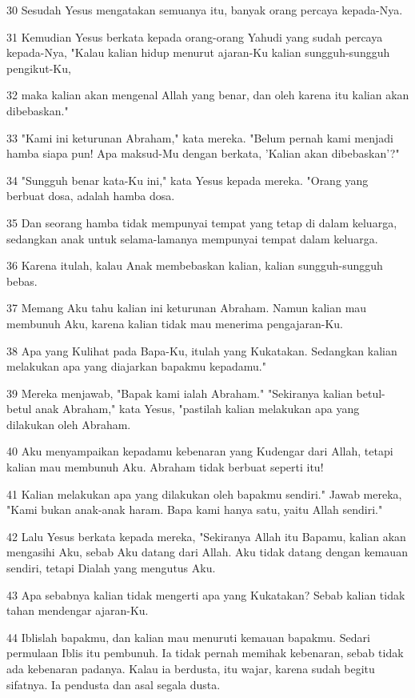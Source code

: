 \par 30 Sesudah Yesus mengatakan semuanya itu, banyak orang percaya kepada-Nya.
\par 31 Kemudian Yesus berkata kepada orang-orang Yahudi yang sudah percaya kepada-Nya, "Kalau kalian hidup menurut ajaran-Ku kalian sungguh-sungguh pengikut-Ku,
\par 32 maka kalian akan mengenal Allah yang benar, dan oleh karena itu kalian akan dibebaskan."
\par 33 "Kami ini keturunan Abraham," kata mereka. "Belum pernah kami menjadi hamba siapa pun! Apa maksud-Mu dengan berkata, 'Kalian akan dibebaskan'?"
\par 34 "Sungguh benar kata-Ku ini," kata Yesus kepada mereka. "Orang yang berbuat dosa, adalah hamba dosa.
\par 35 Dan seorang hamba tidak mempunyai tempat yang tetap di dalam keluarga, sedangkan anak untuk selama-lamanya mempunyai tempat dalam keluarga.
\par 36 Karena itulah, kalau Anak membebaskan kalian, kalian sungguh-sungguh bebas.
\par 37 Memang Aku tahu kalian ini keturunan Abraham. Namun kalian mau membunuh Aku, karena kalian tidak mau menerima pengajaran-Ku.
\par 38 Apa yang Kulihat pada Bapa-Ku, itulah yang Kukatakan. Sedangkan kalian melakukan apa yang diajarkan bapakmu kepadamu."
\par 39 Mereka menjawab, "Bapak kami ialah Abraham." "Sekiranya kalian betul-betul anak Abraham," kata Yesus, "pastilah kalian melakukan apa yang dilakukan oleh Abraham.
\par 40 Aku menyampaikan kepadamu kebenaran yang Kudengar dari Allah, tetapi kalian mau membunuh Aku. Abraham tidak berbuat seperti itu!
\par 41 Kalian melakukan apa yang dilakukan oleh bapakmu sendiri." Jawab mereka, "Kami bukan anak-anak haram. Bapa kami hanya satu, yaitu Allah sendiri."
\par 42 Lalu Yesus berkata kepada mereka, "Sekiranya Allah itu Bapamu, kalian akan mengasihi Aku, sebab Aku datang dari Allah. Aku tidak datang dengan kemauan sendiri, tetapi Dialah yang mengutus Aku.
\par 43 Apa sebabnya kalian tidak mengerti apa yang Kukatakan? Sebab kalian tidak tahan mendengar ajaran-Ku.
\par 44 Iblislah bapakmu, dan kalian mau menuruti kemauan bapakmu. Sedari permulaan Iblis itu pembunuh. Ia tidak pernah memihak kebenaran, sebab tidak ada kebenaran padanya. Kalau ia berdusta, itu wajar, karena sudah begitu sifatnya. Ia pendusta dan asal segala dusta.
